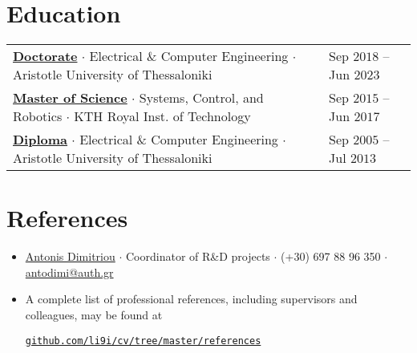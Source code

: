 \documentclass[a4paper,10pt,twoside]{article}
\newcommand{\verticalspacebetweensections}{\vspace{0em}}
\newcommand{\verticalspacebetweensectionandcontent}{\vspace{0.4em}}
\newcommand{\verticalspaceafteritem}{\vspace{-0.8em}}
\begin{document}
\section{\textbf{Education}}\verticalspacebetweensectionandcontent

\begin{center}
{
\begin{tabular}{ll}
  \href{https://ikee.lib.auth.gr/record/354644}{\textbf{Doctorate}} $\cdot$ Electrical \& Computer Engineering $\cdot$ Aristotle University of Thessaloniki & {\small \textcolor{datecolour}{Sep $2018$ -- Jun $2023$}} \\
  \href{http://kth.diva-portal.org/smash/record.jsf?pid=diva2\%3A1102597\&dswid=2875}{\textbf{Master of Science}} $\cdot$ Systems, Control, and Robotics $\cdot$ KTH Royal Inst. of Technology & {\small \textcolor{datecolour}{Sep $2015$ -- Jun $2017$}} \\
  \href{https://ikee.lib.auth.gr/record/291560}{\textbf{Diploma}} $\cdot$ Electrical \& Computer Engineering $\cdot$ Aristotle University of Thessaloniki & {\small \textcolor{datecolour}{Sep $2005$ -- Jul $2013$}}
\end{tabular}
}
\end{center}
\verticalspacebetweensections


\section{\textbf{References}}\verticalspacebetweensectionandcontent
\begin{itemize}
  \item \href{https://gr.linkedin.com/in/antonis-dimitriou-21003452}{Antonis Dimitriou} $\cdot$ Coordinator of R\&D projects $\cdot$ (+30) 697 88 96 350 $\cdot$ \href{mailto:antodimi@auth.gr}{antodimi@auth.gr} \verticalspaceafteritem

\item A complete list of professional references, including supervisors and colleagues, may be found at\verticalspaceafteritem\vspace{0.5em}
\begin{center}\noindent
\href{https://mozilla.github.io/pdf.js/web/viewer.html?file=https://raw.githubusercontent.com/li9i/cv/master/references/references_alexandros_filotheou.pdf}{\texttt{github.com/li9i/cv/tree/master/references}}
\end{center}
\end{itemize}
\end{document}
